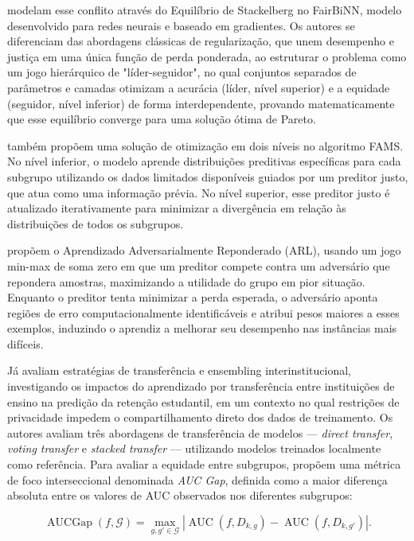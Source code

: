 \citet{yazdani2024fair} modelam esse conflito através do Equilíbrio de Stackelberg no FairBiNN, modelo desenvolvido para redes neurais e baseado em gradientes. Os autores se diferenciam das abordagens clássicas de regularização, que unem desempenho e justiça em uma única função de perda ponderada, ao estruturar o problema como um jogo hierárquico de "líder-seguidor", no qual conjuntos separados de parâmetros e camadas otimizam a acurácia (líder, nível superior) e a equidade (seguidor, nível inferior) de forma interdependente, provando matematicamente que esse equilíbrio converge para uma solução ótima de Pareto.

\citet{shui2022learning} também propõem uma solução de otimização em dois níveis no algoritmo FAMS. No nível inferior, o modelo aprende distribuições preditivas específicas para cada subgrupo utilizando os dados limitados disponíveis guiados por um preditor justo, que atua como uma informação prévia. No nível superior, esse preditor justo é atualizado iterativamente para minimizar a divergência em relação às distribuições de todos os subgrupos.

\citet{lahoti2020fairness} propõem o Aprendizado Adversarialmente Reponderado (ARL), usando um jogo min-max de soma zero em que um preditor compete contra um adversário que repondera amostras, maximizando a utilidade do grupo em pior situação. Enquanto o preditor tenta minimizar a perda esperada, o adversário aponta regiões de erro computacionalmente identificáveis e atribui pesos maiores a esses exemplos, induzindo o aprendiz a melhorar seu desempenho nas instâncias mais difíceis.

Já \citet{gardner2023cross} avaliam estratégias de transferência e ensembling interinstitucional, investigando os impactos do aprendizado por transferência entre instituições de ensino na predição da retenção estudantil, em um contexto no qual restrições de privacidade impedem o compartilhamento direto dos dados de treinamento. Os autores avaliam três abordagens de transferência de modelos — \textit{direct transfer}, \textit{voting transfer} e \textit{stacked transfer} — utilizando modelos treinados localmente como referência. Para avaliar a equidade entre subgrupos, propõem uma métrica de foco interseccional denominada \textit{AUC Gap}, definida como a maior diferença absoluta entre os valores de AUC observados nos diferentes subgrupos:

\begin{equation}
\operatorname{AUCGap}(f,\mathcal{G})
=
\max_{g,g' \in \mathcal{G}}
\left|
\operatorname{AUC}(f,D_{k,g})
-
\operatorname{AUC}(f,D_{k,g'})
\right|.
\label{eq:auc-gap}
\end{equation}

